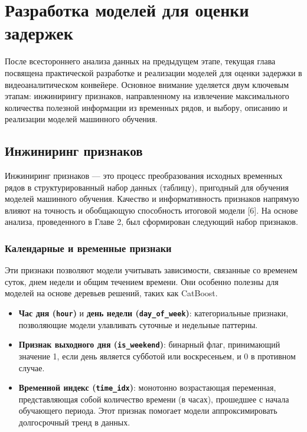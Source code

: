 \chapter{Разработка моделей для оценки задержек}
\label{ch:modeling}

\hspace*{1.25cm}После всестороннего анализа данных на предыдущем этапе, текущая глава посвящена практической разработке и реализации моделей для оценки задержки в видеоаналитическом конвейере. Основное внимание уделяется двум ключевым этапам: инжинирингу признаков, направленному на извлечение максимального количества полезной информации из временных рядов, и выбору, описанию и реализации моделей машинного обучения.

\section{Инжиниринг признаков}
\label{sec:feature_engineering}

\hspace*{1.25cm}Инжиниринг признаков --- это процесс преобразования исходных временных рядов в структурированный набор данных (таблицу), пригодный для обучения моделей машинного обучения. Качество и информативность признаков напрямую влияют на точность и обобщающую способность итоговой модели [6]. На основе анализа, проведенного в Главе 2, был сформирован следующий набор признаков.

\subsection{Календарные и временные признаки}

\hspace*{1.25cm}Эти признаки позволяют модели учитывать зависимости, связанные со временем суток, днем недели и общим течением времени. Они особенно полезны для моделей на основе деревьев решений, таких как CatBoost.

\begin{itemize}
	\item \textbf{Час дня (\texttt{hour})} и \textbf{день недели (\texttt{day\_of\_week})}: категориальные признаки, позволяющие модели улавливать суточные и недельные паттерны.
	\item \textbf{Признак выходного дня (\texttt{is\_weekend})}: бинарный флаг, принимающий значение 1, если день является субботой или воскресеньем, и 0 в противном случае.
	\item \textbf{Временной индекс (\texttt{time\_idx})}: монотонно возрастающая переменная, представляющая собой количество времени (в часах), прошедшее с начала обучающего периода. Этот признак помогает модели аппроксимировать долгосрочный тренд в данных.
\end{itemize}

